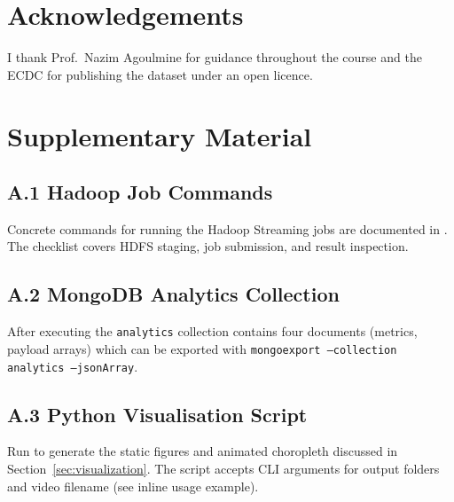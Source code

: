 \documentclass[12pt, a4paper]{article}
\begin{document}
\section*{Acknowledgements}
I thank Prof.\ Nazim Agoulmine for guidance throughout the course and the ECDC for publishing the dataset under an open licence.

\appendix
\section{Supplementary Material}
\subsection*{A.1 Hadoop Job Commands}
Concrete commands for running the Hadoop Streaming jobs are documented in . The checklist covers HDFS staging, job submission, and result inspection.

\subsection*{A.2 MongoDB Analytics Collection}
After executing  the \texttt{analytics} collection contains four documents (metrics, payload arrays) which can be exported with \texttt{mongoexport --collection analytics --jsonArray}.

\subsection*{A.3 Python Visualisation Script}
Run  to generate the static figures and animated choropleth discussed in Section~\ref{sec:visualization}. The script accepts CLI arguments for output folders and video filename (see inline usage example).
\end{document}
